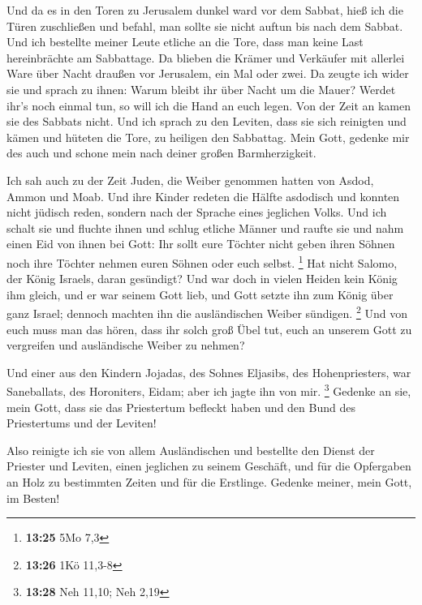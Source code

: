  Und da es in den Toren zu Jerusalem dunkel ward vor dem
Sabbat, hieß ich die Türen zuschließen und befahl, man sollte sie nicht
auftun bis nach dem Sabbat. Und ich bestellte meiner Leute etliche an
die Tore, dass man keine Last hereinbrächte am Sabbattage.
 Da blieben die Krämer und Verkäufer mit allerlei Ware
über Nacht draußen vor Jerusalem, ein Mal oder zwei.  Da
zeugte ich wider sie und sprach zu ihnen: Warum bleibt ihr über Nacht um
die Mauer? Werdet ihr's noch einmal tun, so will ich die Hand an euch
legen. Von der Zeit an kamen sie des Sabbats nicht.  Und
ich sprach zu den Leviten, dass sie sich reinigten und kämen und hüteten
die Tore, zu heiligen den Sabbattag. Mein Gott, gedenke mir des auch und
schone mein nach deiner großen Barmherzigkeit.

 Ich sah auch zu der Zeit Juden, die Weiber genommen
hatten von Asdod, Ammon und Moab.  Und ihre Kinder
redeten die Hälfte asdodisch und konnten nicht jüdisch reden, sondern
nach der Sprache eines jeglichen Volks.  Und ich schalt
sie und fluchte ihnen und schlug etliche Männer und raufte sie und nahm
einen Eid von ihnen bei Gott: Ihr sollt eure Töchter nicht geben ihren
Söhnen noch ihre Töchter nehmen euren Söhnen oder euch selbst.
\footnote{\textbf{13:25} 5Mo 7,3}  Hat nicht Salomo, der
König Israels, daran gesündigt? Und war doch in vielen Heiden kein König
ihm gleich, und er war seinem Gott lieb, und Gott setzte ihn zum König
über ganz Israel; dennoch machten ihn die ausländischen Weiber sündigen.
\footnote{\textbf{13:26} 1Kö 11,3-8}  Und von euch muss
man das hören, dass ihr solch groß Übel tut, euch an unserem Gott zu
vergreifen und ausländische Weiber zu nehmen?

 Und einer aus den Kindern Jojadas, des Sohnes Eljasibs,
des Hohenpriesters, war Saneballats, des Horoniters, Eidam; aber ich
jagte ihn von mir. \footnote{\textbf{13:28} Neh 11,10; Neh 2,19}
 Gedenke an sie, mein Gott, dass sie das Priestertum
befleckt haben und den Bund des Priestertums und der Leviten!

 Also reinigte ich sie von allem Ausländischen und
bestellte den Dienst der Priester und Leviten, einen jeglichen zu seinem
Geschäft,  und für die Opfergaben an Holz zu bestimmten
Zeiten und für die Erstlinge. Gedenke meiner, mein Gott, im Besten!
